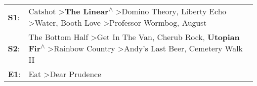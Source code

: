 \begin{supertabular}{p{0.03\textwidth}p{0.92\textwidth}}
 \textbf{S1}:  &  Catshot\textsuperscript{} \textgreater \enspace \textbf{The Linear\textsuperscript{$\wedge$}} \textgreater \enspace Domino Theory\textsuperscript{}, \enspace Liberty Echo\textsuperscript{} \textgreater \enspace Water\textsuperscript{}, \enspace Booth Love\textsuperscript{} \textgreater \enspace Professor Wormbog\textsuperscript{}, \enspace August\textsuperscript{}  \enspace  \\
 \textbf{S2}:  &                         The Bottom Half\textsuperscript{} \textgreater \enspace Get In The Van\textsuperscript{}, \enspace Cherub Rock\textsuperscript{}, \enspace \textbf{Utopian Fir\textsuperscript{$\wedge$}} \textgreater \enspace Rainbow Country\textsuperscript{} \textgreater \enspace Andy's Last Beer\textsuperscript{}, \enspace Cemetery Walk II\textsuperscript{}  \enspace  \\
 \textbf{E1}:  &                                                                                                                                                                                                                                                                                                     Eat\textsuperscript{} \textgreater \enspace Dear Prudence\textsuperscript{}  \enspace  \\
\end{supertabular}
